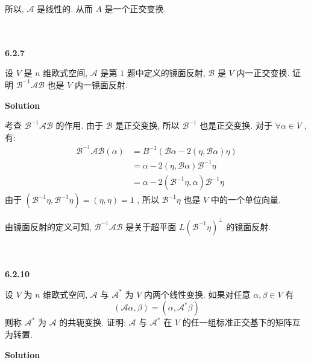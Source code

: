 \documentclass[11pt,a4paper,openany,oneside]{book}
\newcommand\Solution{\noindent\textbf{\textsf{Solution}}\par\medskip}
\begin{document}
所以,  $ \mathcal{A} $ 是线性的. 从而 $ A $ 是一个正交变换. \\  \\  \\  




\begin{myexample}
	\textbf{6.2.7}

设 $ V $ 是 $ n $ 维欧式空间,  $ \mathcal{A} $ 是第 $ 1 $ 题中定义的镜面反射,  $ \mathcal{B} $ 是 $ V $ 内一正交变换. 证明 $ \mathcal{B}^{-1}\mathcal{AB} $ 也是 $ V $ 内一镜面反射. \\

\end{myexample}
\Solution  

考查 $ \mathcal{B}^{-1}\mathcal{AB} $ 的作用. 由于 $ \mathcal{B} $ 是正交变换, 所以 $ \mathcal{B}^{-1} $ 也是正交变换. 对于 $ \forall \alpha \in V $ , 有:
\begin{align*}
\mathcal{B}^{-1}\mathcal{AB}(\alpha) &= B^{-1}(\mathcal{B}\alpha - 2(\eta, \mathcal{B}\alpha)\eta) \\
&= \alpha - 2(\eta, \mathcal{B}\alpha)\mathcal{B}^{-1}\eta \\
&= \alpha - 2(\mathcal{B}^{-1}\eta, \alpha)\mathcal{B}^{-1}\eta 
\end{align*}
由于 $ (\mathcal{B}^{-1}\eta, \mathcal{B}^{-1}\eta) = (\eta, \eta)=1 $ , 所以 $ \mathcal{B}^{-1}\eta $ 也是 $ V $ 中的一个单位向量. 

由镜面反射的定义可知,  $ \mathcal{B}^{-1}\mathcal{AB} $ 是关于超平面 $ L(\mathcal{B}^{-1}\eta)^{\perp} $ 的镜面反射.\\ \\ \\





\begin{myexample}
	\textbf{6.2.10}

设 $ V $ 为 $ n $ 维欧式空间,  $ \mathcal{A} $ 与 $ \mathcal{A}^* $ 为 $ V $ 内两个线性变换. 如果对任意 $ \alpha, \beta \in V $ 有
 $$  (\mathcal{A}\alpha, \beta) = (\alpha, \mathcal{A}^*\beta)  $$ 
则称 $ \mathcal{A}^* $ 为 $ \mathcal{A} $ 的共轭变换. 证明: $ \mathcal{A} $ 与 $ \mathcal{A}^* $ 在 $ V $ 的任一组标准正交基下的矩阵互为转置. \\

\end{myexample}
\Solution  
\end{document}
